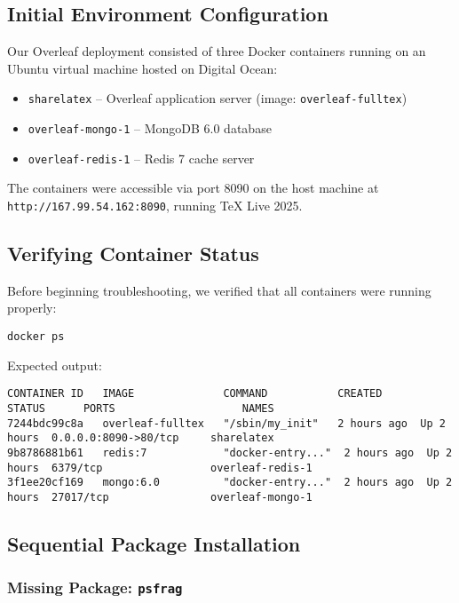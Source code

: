 \subsection{Initial Environment Configuration}

Our Overleaf deployment consisted of three Docker containers running on an Ubuntu virtual machine hosted on Digital Ocean:

\begin{itemize}
  \item \texttt{sharelatex} – Overleaf application server (image: \texttt{overleaf-fulltex})
  \item \texttt{overleaf-mongo-1} – MongoDB 6.0 database
  \item \texttt{overleaf-redis-1} – Redis 7 cache server
\end{itemize}

The containers were accessible via port 8090 on the host machine at \texttt{http://167.99.54.162:8090}, running \TeX{} Live 2025.

\subsection{Verifying Container Status}

Before beginning troubleshooting, we verified that all containers were running properly:

\begin{verbatim}
docker ps
\end{verbatim}

Expected output:

\begin{verbatim}
CONTAINER ID   IMAGE              COMMAND           CREATED      STATUS      PORTS                    NAMES
7244bdc99c8a   overleaf-fulltex   "/sbin/my_init"   2 hours ago  Up 2 hours  0.0.0.0:8090->80/tcp     sharelatex
9b8786881b61   redis:7            "docker-entry..."  2 hours ago  Up 2 hours  6379/tcp                 overleaf-redis-1
3f1ee20cf169   mongo:6.0          "docker-entry..."  2 hours ago  Up 2 hours  27017/tcp                overleaf-mongo-1
\end{verbatim}

\subsection{Sequential Package Installation}

\subsubsection{Missing Package: \texttt{psfrag}}

